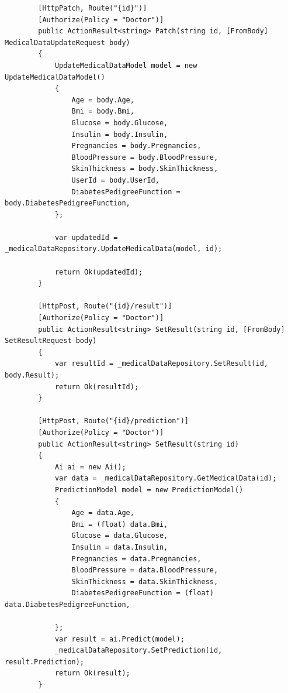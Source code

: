 \documentclass[12pt,a4paper]{article}
\begin{document}
\begin{lstlisting}
        [HttpPatch, Route("{id}")]
        [Authorize(Policy = "Doctor")]
        public ActionResult<string> Patch(string id, [FromBody] MedicalDataUpdateRequest body)
        {
            UpdateMedicalDataModel model = new UpdateMedicalDataModel()
            {
                Age = body.Age,
                Bmi = body.Bmi,
                Glucose = body.Glucose,
                Insulin = body.Insulin,
                Pregnancies = body.Pregnancies,
                BloodPressure = body.BloodPressure,
                SkinThickness = body.SkinThickness,
                UserId = body.UserId,
                DiabetesPedigreeFunction = body.DiabetesPedigreeFunction,
            };

            var updatedId = _medicalDataRepository.UpdateMedicalData(model, id);

            return Ok(updatedId);
        }

        [HttpPost, Route("{id}/result")]
        [Authorize(Policy = "Doctor")]
        public ActionResult<string> SetResult(string id, [FromBody] SetResultRequest body)
        {
            var resultId = _medicalDataRepository.SetResult(id, body.Result);
            return Ok(resultId);
        }
        
        [HttpPost, Route("{id}/prediction")]
        [Authorize(Policy = "Doctor")]
        public ActionResult<string> SetResult(string id)
        {
            Ai ai = new Ai();
            var data = _medicalDataRepository.GetMedicalData(id);
            PredictionModel model = new PredictionModel()
            {
                Age = data.Age,
                Bmi = (float) data.Bmi,
                Glucose = data.Glucose,
                Insulin = data.Insulin,
                Pregnancies = data.Pregnancies,
                BloodPressure = data.BloodPressure,
                SkinThickness = data.SkinThickness,
                DiabetesPedigreeFunction = (float) data.DiabetesPedigreeFunction,

            };
            var result = ai.Predict(model);
            _medicalDataRepository.SetPrediction(id, result.Prediction);
            return Ok(result);
        }


\end{lstlisting}
\end{document}
